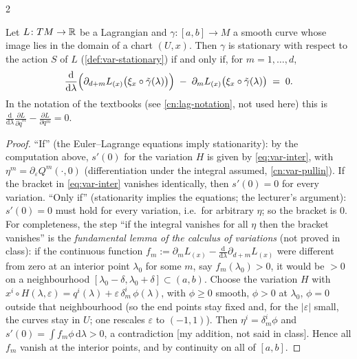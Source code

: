 \begin{paracol}{2}
\begin{theorem}\label{thm:var-el}
Let $L\colon TM\to\mathbb{R}$ be a Lagrangian and $\gamma\colon[a,b]\to M$ a smooth curve whose image lies in the domain of a chart $(U,x)$. Then $\gamma$ is stationary with respect to the action $S$ of $L$ (\cref{def:var-stationary}) if and only if, for $m=1,\dots,d$,
\begin{equation}\label{eq:var-el}
  \frac{\mathrm d}{\mathrm d\lambda}\Bigl(\partial_{d+m}L_{(x)}\bigl(\xi_x\circ\tilde\gamma(\lambda)\bigr)\Bigr)\;-\;\partial_mL_{(x)}\bigl(\xi_x\circ\tilde\gamma(\lambda)\bigr)\;=\;0 .
\end{equation}
In the notation of the textbooks (see \cref{cn:lag-notation}, not used here) this is $\frac{\mathrm d}{\mathrm d\lambda}\frac{\partial L}{\partial\dot q^m}-\frac{\partial L}{\partial q^m}=0$.
\end{theorem}
\begin{proof}
``If'' (the Euler--Lagrange equations imply stationarity): by the computation above, $s'(0)$ for the variation $H$ is given by \eqref{eq:var-inter}, with $\eta^m=\partial_\varepsilon Q^m(\cdot,0)$ (differentiation under the integral assumed, \cref{cn:var-pullin}). If the bracket in \eqref{eq:var-inter} vanishes identically, then $s'(0)=0$ for every variation. ``Only if'' (stationarity implies the equations; the lecturer's argument): $s'(0)=0$ must hold for every variation, i.e.\ for arbitrary $\eta$; so the bracket is $0$. For completeness, the step ``if the integral vanishes for all $\eta$ then the bracket vanishes'' is the \emph{fundamental lemma of the calculus of variations} (not proved in class): if the continuous function $f_m:=\partial_mL_{(x)}-\frac{\mathrm d}{\mathrm d\lambda}\partial_{d+m}L_{(x)}$ were different from zero at an interior point $\lambda_0$ for some $m$, say $f_m(\lambda_0)>0$, it would be $>0$ on a neighbourhood $[\lambda_0-\delta,\lambda_0+\delta]\subset(a,b)$. Choose the variation $H$ with $x^i\circ H(\lambda,\varepsilon)=q^i(\lambda)+\varepsilon\,\delta^i_m\,\phi(\lambda)$, with $\phi\ge0$ smooth, $\phi>0$ at $\lambda_0$, $\phi=0$ outside that neighbourhood (so the end points stay fixed and, for the $|\varepsilon|$ small, the curves stay in $U$; one rescales $\varepsilon$ to $(-1,1)$). Then $\eta^i=\delta^i_m\phi$ and $s'(0)=\int f_m\phi\,\mathrm d\lambda>0$, a contradiction [my addition, not said in class]. Hence all $f_m$ vanish at the interior points, and by continuity on all of $[a,b]$.
\end{proof}


\end{paracol}
